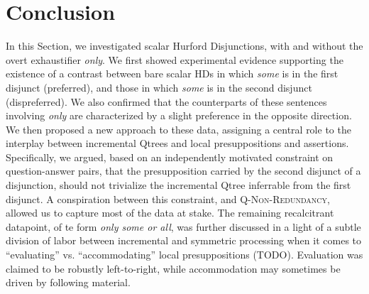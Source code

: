\section{Conclusion}
In this Section, we investigated scalar Hurford Disjunctions, with and without the overt exhaustifier \textit{only}. We first showed experimental evidence supporting the existence of a contrast between bare scalar HDs in which \textit{some} is in the first disjunct (preferred), and those in which \textit{some} is in the second disjunct (dispreferred). We also confirmed that the counterparts of these sentences involving \textit{only} are characterized by a slight preference in the opposite direction. We then proposed a new approach to these data, assigning a central role to the interplay between incremental Qtrees and local presuppositions and assertions. Specifically, we argued, based on an independently motivated constraint on question-answer pairs, that the presupposition carried by the second disjunct of a disjunction, should not trivialize the incremental Qtree inferrable from the first disjunct. A conspiration between this constraint, and \textsc{Q-Non-Redundancy}, allowed us to capture most of the data at stake. The remaining recalcitrant datapoint, of te form \textit{only some or all}, was further discussed in a light of a subtle division of labor between incremental and symmetric processing when it comes to ``evaluating'' vs. ``accommodating'' local presuppositions (TODO). Evaluation was claimed to be robustly left-to-right, while accommodation may sometimes be driven by following material.



%

